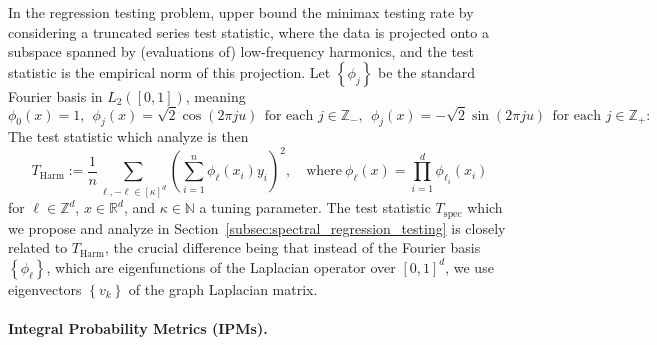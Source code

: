 \documentclass{article}
\newcommand{\Reals}{\mathbb{R}}
\newcommand{\set}[1]{\left\{#1\right\}}
\newcommand{\1}{\mathbf{1}}
\theoremstyle{alden}
\theoremstyle{aldenthm}
\theoremstyle{definition}
\theoremstyle{remark}
\begin{document}
In the regression testing problem, \citet{ingster09} upper bound the minimax testing rate by considering a truncated series test statistic, where the data is projected onto a subspace spanned by (evaluations of) low-frequency harmonics, and the test statistic is the empirical norm of this projection. Let $\set{\phi_j}$ be the standard Fourier basis in $L_2([0,1])$, meaning
\begin{equation*}
\phi_0(x) = 1,~~ \phi_j(x) = \sqrt{2}\cos(2\pi j u) ~~\textrm{for each $j \in \mathbb{Z}_{-}$},~~ \phi_j(x) = -\sqrt{2}\sin(2\pi j u) ~~\textrm{for each $j \in \mathbb{Z}_{+}$}:
\end{equation*}
The test statistic which \citet{ingster09} analyze is then
\begin{equation}
\label{eqn:harmonic}
T_{\mathrm{Harm}} := \frac{1}{n}\sum_{\ell,-\ell \in [\kappa]^d} \left(\sum_{i = 1}^{n} \phi_{\ell}(x_i) y_i\right)^2, \quad \textrm{where}~ \phi_{\ell}(x) = \prod_{i = 1}^{d} \phi_{\ell_i}(x_i)
\end{equation}
for $\ell \in \mathbb{Z}^d$, $x \in \Reals^d$, and 
$\kappa \in \mathbb{N}$ a tuning parameter. The test statistic $T_{\mathrm{spec}}$ which we propose and analyze in Section~\ref{subsec:spectral_regression_testing} is closely related to $T_{\mathrm{Harm}}$, the crucial difference being that instead of the Fourier basis $\set{\phi_{\ell}}$, which are eigenfunctions of the Laplacian operator over $[0,1]^d$, we use eigenvectors $\set{v_k}$ of the graph Laplacian matrix.

\paragraph{Integral Probability Metrics (IPMs).}
\end{document}
